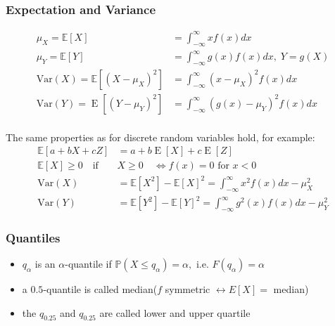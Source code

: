 \subsubsection{Expectation and Variance}
\noindent\begin{align*}
    \mu_X=\mathbb{E}[X]                                 & =\int_{-\infty}^{\infty}xf(x)dx                               \\
    \mu_Y=\mathbb{E}[Y]                                 & =\int_{-\infty}^{\infty}g(x)f(x)dx,\;Y=g(X)                   \\
    \mathrm{Var}(X)=\mathbb{E}[{(X-\mu_{X})}^{2}]       & =\int_{-\infty}^{\infty}{(x-\mu_{X})}^{2}f(x)dx               \\
    \mathrm{Var}(Y)=\operatorname{E}[{(Y-\mu_{Y})}^{2}] & =\int_{-\infty}^{\infty}{\left(g(x)-\mu_{Y}\right)}^{2}f(x)dx
\end{align*}
\\
The same properties as for discrete random variables hold, for example:
\noindent\begin{align*}
    \mathbb{E}[a+bX+cZ]               & =a+b\operatorname{E}[X]+c\operatorname{E}[Z]                                             \\
    \mathbb{E}[X]\geq0\quad\text{if } & X\geq0\quad\Leftrightarrow f(x) = 0 \text{ for } x<0                                     \\
    \mathrm{Var}(X)                   & =\mathbb{E}[X^{2}]-{\mathbb{E}[X]}^{2}=\int_{-\infty}^{\infty}x^{2}f(x)dx-\mu_{X}^{2}    \\
    \mathrm{Var}(Y)                   & =\mathbb{E}[Y^{2}]-{\mathbb{E}[Y]}^{2}=\int_{-\infty}^{\infty}g^{2}(x)f(x)dx-\mu_{Y}^{2}
\end{align*}

\subsubsection{Quantiles}
\begin{itemize}
    \item $q_\alpha$ is an $\alpha$-quantile if $\mathbb{P}(X\leq q_\alpha)=\alpha,\text{ i.e. }F(q_\alpha)=\alpha$
    \item a $0.5$-quantile is called median\newline ($f$ symmetric $\leftrightarrow E[X]=$ median)
    \item the $q_{0.25}$ and $q_{0.25}$ are called lower and upper quartile
\end{itemize}

